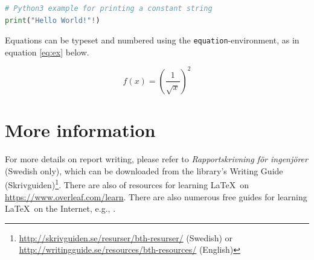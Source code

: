 \documentclass[12pt,a4paper]{article}
\begin{document}
\begin{lstlisting}[frame=single,language=Python]
# Python3 example for printing a constant string 
print("Hello World!"!)
\end{lstlisting}

Equations can be typeset and numbered using the \texttt{equation}-environment, as in equation \ref{eq:ex} below.

\begin{equation}
\label{eq:ex}
    f(x) = (\frac{1}{\sqrt{x}})^2
\end{equation}


\section{More information}
\label{sec:more}
For more details on report writing, please refer to \textit{Rapportskrivning för ingenjörer} \cite{nilsson2018rapport} (Swedish only), which can be downloaded from the library's Writing Guide (Skrivguiden)\footnote{\url{http://skrivguiden.se/resurser/bth-resurser/} (Swedish) or \url{http://writingguide.se/resources/bth-resources/} (English)}.  There are also of resources for learning \LaTeX\ on \url{https://www.overleaf.com/learn}. There are also numerous free guides for learning \LaTeX\ on the Internet, e.g., \cite{oetiker2011not}.

\small


\end{document}

